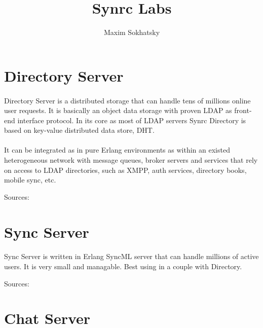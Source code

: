 \documentclass[11pt]{article}
\begin{document}

\title{Synrc Labs}
\author{Maxim Sokhatsky}


\section*{Directory Server}
\paragraph{}
Directory Server is a distributed storage that can handle tens of
millions online user requests. It is basically an object data storage
with proven LDAP as front-end interface protocol.
In its core as most of LDAP servers Synrc Directory is based on
key-value distributed data store, DHT.
\paragraph{}
It can be integrated as in pure Erlang environments as within an
existed heterogeneous network with message queues, broker servers
and services that rely on access to LDAP directories, such as XMPP,
auth services, directory books, mobile sync, etc.

Sources: 

\section*{Sync Server}
\paragraph{}
Sync Server is written in Erlang SyncML server that can handle
millions of active users. It is very small and managable.
Best using in a couple with Directory.

Sources: 

\section*{Chat Server}
\end{document}

